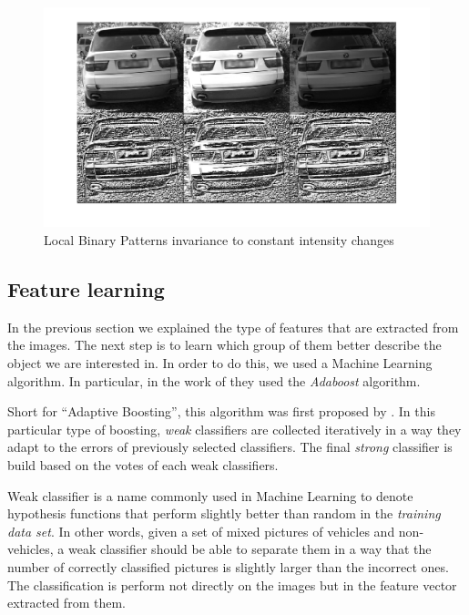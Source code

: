 \begin{figure}
\begin{center}
    \includegraphics[scale=0.3]{img/invariance.png}
\end{center}
\caption{Local Binary Patterns invariance to constant intensity changes}
\label{fig:lbp-invariant}
\end{figure}



\subsection{Feature learning} %
\label{sub:feature-learning}

In the previous section we explained the type of features that are extracted
from the images. The next step is to learn which group of them better describe
the object we are interested in. In order to do this, we used a Machine Learning
algorithm. In particular, in the work of \cite{viola-jones} they used the
\textit{Adaboost} algorithm. 

Short for ``Adaptive Boosting'', this algorithm was first proposed by
\cite{freund}. In this particular type of boosting, \textit{weak} classifiers
are collected iteratively in a way they adapt to the errors of previously
selected classifiers. The final \textit{strong} classifier is build based on the
votes of each weak classifiers. 

Weak classifier is a name commonly used in Machine Learning to denote hypothesis 
functions that perform slightly better than random in the \textit{training data
set}. In other words, given a set of mixed pictures of vehicles and non-vehicles, a
weak classifier should be able to separate them in a way that the number of
correctly classified pictures is slightly larger than the incorrect ones. The
classification is perform not directly on the images but in the feature vector
extracted from them.

